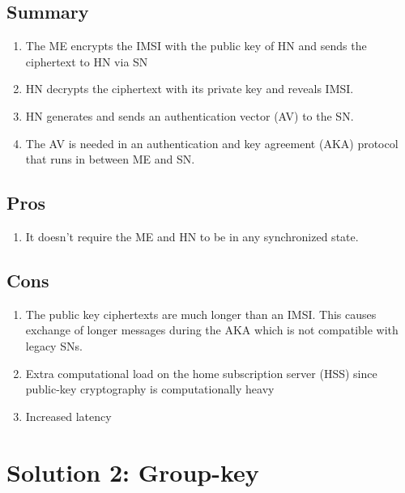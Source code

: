 \documentclass[portrait,a0]{a0poster}
\begin{document}
\begin{multicols}{2}
\subsection*{Summary}
\begin{enumerate}
\item The ME encrypts the IMSI with the public key of HN and sends the ciphertext to HN via SN 
\item HN decrypts the ciphertext with its private key and reveals IMSI. 
\item HN generates and sends an authentication vector (AV) to the SN.
\item The AV is needed in an authentication and key agreement (AKA) protocol that runs in between ME and SN.
\end{enumerate}
\subsection*{Pros}
\begin{enumerate}
\item It doesn't require the ME and HN to be in any synchronized state. 
\end{enumerate}
\subsection*{Cons}
\begin{enumerate}
\item The public key ciphertexts are much longer than an IMSI. This causes exchange of longer messages during the AKA which is not compatible with legacy SNs. 
\item Extra computational load on the home subscription server (HSS) since public-key cryptography is computationally heavy
\item Increased latency
\end{enumerate}  

\section{Solution 2: Group-key}

\end{multicols}
\end{document}
